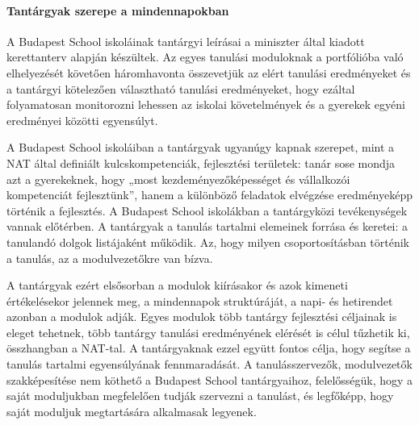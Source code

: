\paragraph{Tantárgyak szerepe a mindennapokban}

A Budapest School iskoláinak tantárgyi leírásai a miniszter által kiadott kerettanterv alapján készültek. Az egyes tanulási moduloknak a portfólióba való elhelyezését követően háromhavonta összevetjük az elért tanulási eredményeket és  a tantárgyi kötelezően választható tanulási eredményeket, hogy ezáltal folyamatosan monitorozni lehessen az iskolai követelmények és a gyerekek egyéni eredményei közötti egyensúlyt.

A Budapest School iskoláiban a tantárgyak ugyanúgy kapnak szerepet, mint a NAT által definiált kulcskompetenciák, fejlesztési területek: tanár sose mondja azt a gyerekeknek, hogy „most kezdeményezőképességet és vállalkozói kompetenciát fejlesztünk'', hanem a különböző feladatok elvégzése eredményeképp történik a fejlesztés. A Budapest School iskolákban a tantárgyközi tevékenységek vannak előtérben. A tantárgyak a tanulás tartalmi elemeinek forrása és keretei: a tanulandó dolgok listájaként működik. Az, hogy milyen csoportosításban történik a tanulás, az a modulvezetőkre van bízva.

A tantárgyak ezért elsősorban a modulok kiírásakor és azok kimeneti értékelésekor jelennek meg, a mindennapok struktúráját, a napi- és hetirendet azonban a modulok adják. Egyes modulok több tantárgy fejlesztési céljainak is eleget tehetnek, több tantárgy tanulási eredményének elérését is célul tűzhetik ki, összhangban a NAT-tal. A tantárgyaknak ezzel együtt fontos célja, hogy segítse a tanulás tartalmi egyensúlyának fennmaradását. A tanulásszervezők, modulvezetők szakképesítése nem köthető a Budapest School tantárgyaihoz, felelősségük, hogy a saját moduljukban megfelelően tudják szervezni a tanulást, és legfőképp, hogy saját moduljuk megtartására alkalmasak legyenek.